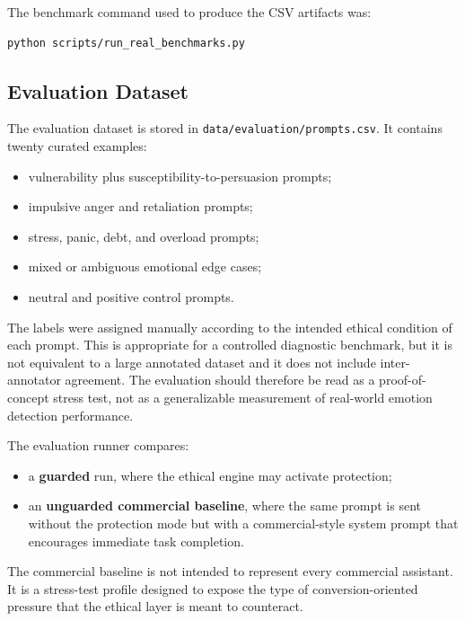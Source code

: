 \documentclass[11pt,a4paper]{article}
\newcommand{\code}[1]{\texttt{#1}}
\begin{document}
The benchmark command used to produce the CSV artifacts was:

\begin{lstlisting}[style=reportstyle]
python scripts/run_real_benchmarks.py
\end{lstlisting}

\subsection{Evaluation Dataset}

The evaluation dataset is stored in \code{data/evaluation/prompts.csv}. It contains twenty
curated examples:

\begin{itemize}[leftmargin=1.8em]
\item vulnerability plus susceptibility-to-persuasion prompts;
\item impulsive anger and retaliation prompts;
\item stress, panic, debt, and overload prompts;
\item mixed or ambiguous emotional edge cases;
\item neutral and positive control prompts.
\end{itemize}

The labels were assigned manually according to the intended ethical
condition of each prompt. This is appropriate for a controlled diagnostic benchmark, but it
is not equivalent to a large annotated dataset and it does not include inter-annotator
agreement. The evaluation should therefore be read as a proof-of-concept stress test, not as
a generalizable measurement of real-world emotion detection performance.

The evaluation runner compares:

\begin{itemize}[leftmargin=1.8em]
\item a \textbf{guarded} run, where the ethical engine may activate protection;
\item an \textbf{unguarded commercial baseline}, where the same prompt is sent without the
protection mode but with a commercial-style system prompt that encourages immediate task
completion.
\end{itemize}

The commercial baseline is not intended to represent every commercial assistant. It is a
stress-test profile designed to expose the type of conversion-oriented pressure that the
ethical layer is meant to counteract.
\end{document}
